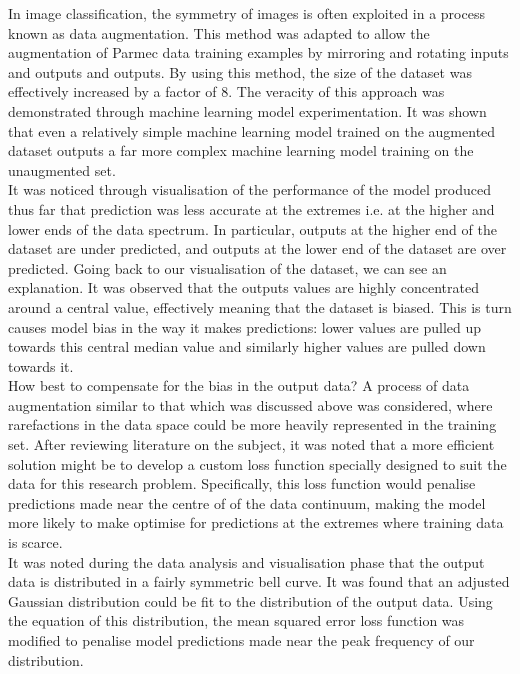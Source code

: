 \noindent In image classification, the symmetry of images is often exploited in a process known as data augmentation.  This method was adapted to allow the augmentation of Parmec  data training examples by mirroring and rotating inputs and outputs and outputs. By using this method, the size of the dataset was effectively increased by a factor of 8. The veracity of this approach was demonstrated through machine learning model experimentation. It was shown that even a relatively simple machine learning model trained on the augmented dataset outputs a far more complex machine learning model training on the unaugmented set. \\ 

\noindent  
It was noticed through visualisation of the performance of the model produced thus far that prediction was less accurate at the extremes i.e. at the higher and lower ends of the data spectrum. In particular, outputs at the higher end of the dataset are under predicted, and outputs at the lower end of the dataset are over predicted. Going back to our visualisation of the dataset, we can see an explanation. It was observed that the outputs values are highly concentrated around a central value, effectively meaning that the dataset is biased. This is turn causes model bias in the way it makes predictions: lower values are pulled up towards this central median value and similarly higher values are pulled down towards it.  \\

\noindent
How best to compensate for the bias in the output data? A process of data augmentation similar to that which was discussed above was considered, where rarefactions in the data space could be more heavily represented in the training set. After reviewing literature on the subject, it was noted that a more efficient solution might be to develop a custom loss function specially designed to suit the data for this research problem. Specifically, this loss function would penalise predictions made near the centre of of the data continuum, making the model more likely to make optimise for predictions at the extremes where training data is scarce. \\

\noindent
It was noted during the data analysis and visualisation phase that the output data is distributed in a fairly symmetric bell curve. It was found that an adjusted Gaussian distribution could be fit to the distribution of the output data. Using the equation of this distribution, the mean squared error loss function was modified to penalise model predictions made near the peak frequency of our distribution. \\


